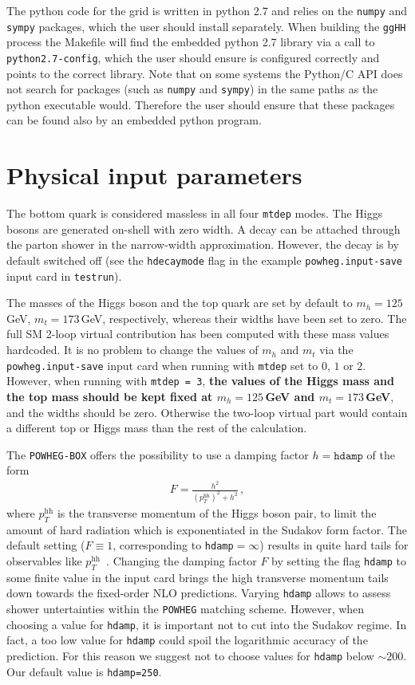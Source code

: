 \documentclass[paper]{JHEP3}
\newcommand\POWHEG{{\tt POWHEG}}
\newcommand\POWHEGBOX{{\tt POWHEG-BOX}}
\newcommand\pthh{\ensuremath{p_{T}^{\mathrm{hh}}}\xspace}
\begin{document}
The python code for the grid is written in python 2.7 and relies on the {\tt numpy} and {\tt sympy} packages, which 
the user should install separately. When building the {\tt ggHH} process the Makefile will find the embedded python 2.7 library
via a call to {\tt python2.7-config}, which the user should ensure is configured correctly and points to the correct library.
Note that on some systems the Python/C API does not search for packages (such as {\tt numpy} and {\tt sympy}) in the same 
paths as the python executable would. Therefore the user should ensure that these packages can be found also by an embedded python program.

\section{Physical input parameters}

The bottom quark is considered massless in all four {\tt mtdep} modes. The Higgs
bosons are generated on-shell with zero width. A decay can be attached
through the parton shower in the narrow-width approximation. However,
the decay is by default switched off (see the {\tt hdecaymode} flag in the
example {\tt powheg.input-save} input card in {\tt testrun}).

The masses of the Higgs boson and the top quark are set by default to
$m_h=125$\,GeV, $m_t=173$\,GeV, respectively, whereas their widths
have been set to zero. The full SM 2-loop virtual contribution has
been computed with these mass values hardcoded. 
It is no problem to change the values of $m_h$
and $m_t$ via the {\tt powheg.input-save} input card when running with
{\tt mtdep} set to $0$, $1$ or $2$.
However, when running with {\tt mtdep = 3}, 
 {\bf the values of the Higgs mass and
the top mass should be kept fixed at $m_h=125$\,GeV and $m_t=173$\,GeV}, and the widths should be zero.
Otherwise the two-loop virtual part would contain a different top or Higgs mass than the rest of the calculation.

The \POWHEGBOX{} offers the possibility to use a damping factor $h=\texttt{hdamp}$ of the
form~\cite{Alioli:2008tz,Alioli:2009je}
\begin{align}
  F=\frac{h^{2}}{(\pthh)^2+h^{2}}\,,
\end{align}
where \pthh is the transverse momentum of the Higgs boson pair, to
limit the amount of hard radiation which is exponentiated in the
Sudakov form factor. The default setting ($F\equiv1$, corresponding to {\tt hdamp}$=\infty$) results in
quite hard tails for observables like
$\pthh$~\cite{Heinrich:2017kxx}. Changing the damping factor $F$ by
setting the flag {\tt hdamp} to some finite value in the input
card brings the high transverse momentum tails down towards the fixed-order NLO
predictions. Varying {\tt hdamp} allows to assess shower untertainties
within the \POWHEG{} matching scheme. However, when choosing a value
for {\tt hdamp}, it is important not to cut into the Sudakov
regime. In fact, a too low value for {\tt hdamp} could spoil the
logarithmic accuracy of the prediction. For this reason we suggest not
to choose values for {\tt hdamp} below $\sim 200$. Our default value is  {\tt hdamp=250}.
\end{document}
